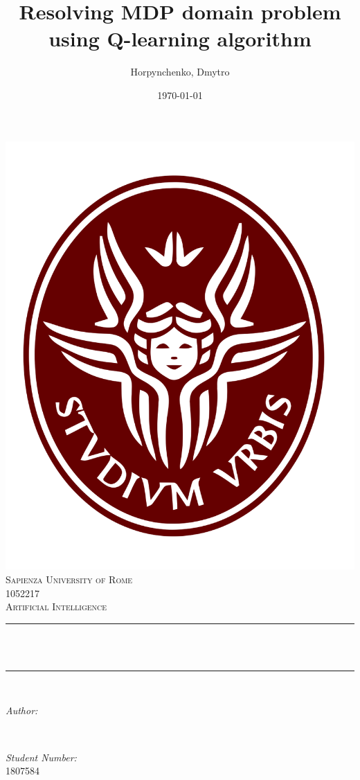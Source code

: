 \documentclass[12pt]{article}
\title{Resolving MDP domain problem using Q-learning algorithm}			%
\author{Horpynchenko, Dmytro} 								%
\date{\today}											%
\makeatletter
\let\thetitle\@title
\let\theauthor\@author
\makeatother
\begin{document}

\begin{titlepage}
	\centering
    \includegraphics[scale = 0.2]{images/sapienza_logo_only.png}\\[1.0 cm]	%
    \textsc{\LARGE Sapienza University of Rome}\\[2.0 cm]	%
	\textsc{\Large 1052217}\\[0.5 cm]				%
	\textsc{\large Artificial Intelligence}\\[0.5 cm]				%
	\rule{\linewidth}{0.2 mm} \\[0.4 cm]
	{ \huge \bfseries \thetitle}\\
	\rule{\linewidth}{0.2 mm} \\[1.5 cm]

	\begin{minipage}{0.4\textwidth}
		\begin{flushleft} \large
			\emph{Author:}\\
			\theauthor
			\end{flushleft}
			\end{minipage}~
			\begin{minipage}{0.4\textwidth}
			\begin{flushright} \large
			\emph{Student Number:} \\
			1807584				%
		\end{flushright}
	\end{minipage}\\[2 cm]


	\vfill

\end{titlepage}
\end{document}
